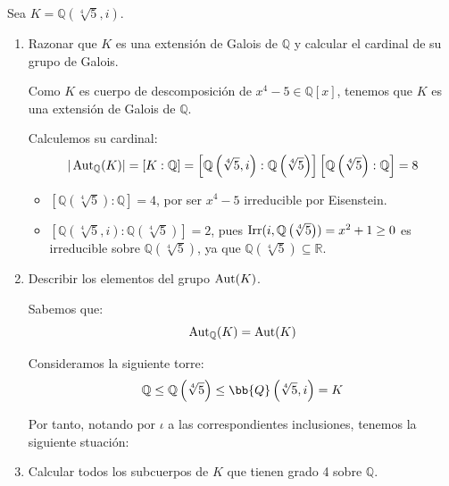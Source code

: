 \begin{ejercicio}
    Sea $K = \mathbb{Q}\left(\sqrt[4]{5},i\right)$.
    \begin{enumerate}
        \item Razonar que $K$ es una extensión de Galois de $\mathbb{Q}$ y calcular el cardinal de su grupo de Galois.
        
        Como $K$ es cuerpo de descomposición de $x^4-5\in \mathbb{Q}[x]$, tenemos que $K$ es una extensión de Galois de $\mathbb{Q}$.
        
        Calculemos su cardinal:
        \begin{equation*}
            |\operatorname{Aut}_{\mathbb{Q}}(K)| = [K:\mathbb{Q}] = \left[\mathbb{Q}\left(\sqrt[4]{5},i\right):\mathbb{Q}\left(\sqrt[4]{5}\right)\right] \left[\mathbb{Q}\left(\sqrt[4]{5}\right):\mathbb{Q}\right] = 8
        \end{equation*}
        \begin{itemize}
            \item $\left[\mathbb{Q}\left(\sqrt[4]{5}\right):\mathbb{Q}\right] = 4$, por ser $x^4-5$ irreducible por Eisenstein.
            \item $\left[\mathbb{Q}\left(\sqrt[4]{5},i\right):\mathbb{Q}\left(\sqrt[4]{5}\right)\right] = 2$, pues $\operatorname{Irr}(i,\mathbb{Q}\left(\sqrt[4]{5}\right)) = x^2+1\geq 0$ es irreducible sobre $\mathbb{Q}\left(\sqrt[4]{5}\right)$, ya que $\mathbb{Q}\left(\sqrt[4]{5}\right)\subseteq \mathbb{R}$.
        \end{itemize}
        \item Describir los elementos del grupo $\operatorname{Aut}(K)$.
        
        Sabemos que:
        \begin{equation*}
            \operatorname{Aut}_{\mathbb{Q}}(K) =\operatorname{Aut}(K)
        \end{equation*}
        
        Consideramos la siguiente torre:
        \begin{equation*}
            \mathbb{Q} \leq \mathbb{Q}\left(\sqrt[4]{5}\right) \leq \bb{Q}\left(\sqrt[4]{5},i\right) = K
        \end{equation*}

        Por tanto, notando por $\iota$ a las correspondientes inclusiones, tenemos la siguiente stuación:
        \begin{center}
        \end{center}
        \item Calcular todos los subcuerpos de $K$ que tienen grado 4 sobre $\mathbb{Q}$.
        

\end{enumerate}
\end{ejercicio}
